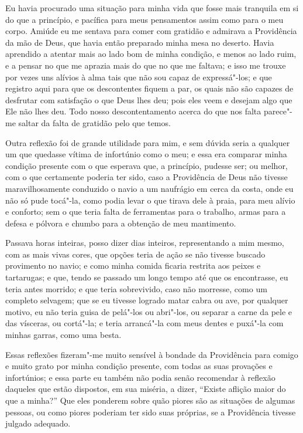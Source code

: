 Eu havia procurado uma situação para minha vida que fosse mais tranquila
em si do que a princípio, e pacífica para meus pensamentos assim como
para o meu corpo. Amiúde eu me sentava para comer com gratidão e
admirava a Providência da mão de Deus, que havia então preparado minha
mesa no deserto. Havia aprendido a atentar mais ao lado bom de minha
condição, e menos ao lado ruim, e a pensar no que me aprazia mais do que
no que me faltava; e isso me trouxe por vezes uns alívios à alma tais
que não sou capaz de expressá"-los; e que registro aqui para que os
descontentes fiquem a par, os quais não são capazes de desfrutar com
satisfação o que Deus lhes deu; pois eles veem e desejam algo que Ele
não lhes deu. Todo nosso descontentamento acerca do que nos falta
parece"-me saltar da falta de gratidão pelo que temos.

Outra reflexão foi de grande utilidade para mim, e sem dúvida seria a
qualquer um que quedasse vítima de infortúnio como o meu; e essa era
comparar minha condição presente com o que esperava que, a princípio,
pudesse ser; ou melhor, com o que certamente poderia ter sido, caso a
Providência de Deus não tivesse maravilhosamente conduzido o navio a um
naufrágio em cerca da costa, onde eu não só pude tocá"-la, como podia
levar o que tirava dele à praia, para meu alívio e conforto; sem o que
teria falta de ferramentas para o trabalho, armas para a defesa e
pólvora e chumbo para a obtenção de meu mantimento.

Passava horas inteiras, posso dizer dias inteiros, representando a mim
mesmo, com as mais vivas cores, que opções teria de ação se não tivesse
buscado provimento no navio; e como minha comida ficaria restrita aos
peixes e tartarugas; e que, tendo se passado um longo tempo até que os
encontrasse, eu teria antes morrido; e que teria sobrevivido, caso não
morresse, como um completo selvagem; que se eu tivesse logrado matar
cabra ou ave, por qualquer motivo, eu não teria guisa de pelá"-los ou
abri"-los, ou separar a carne da pele e das vísceras, ou cortá"-la; e
teria arrancá"-la com meus dentes e puxá"-la com minhas garras, como uma
besta.

Essas reflexões fizeram"-me muito sensível à bondade da Providência para
comigo e muito grato por minha condição presente, com todas as suas
provações e infortúnios; e essa parte eu também não podia senão
recomendar à reflexão daqueles que estão dispostos, em sua miséria, a
dizer, ``Existe aflição maior do que a minha?'' Que eles ponderem sobre
quão piores são as situações de algumas pessoas, ou como piores poderiam
ter sido suas próprias, se a Providência tivesse julgado adequado.

